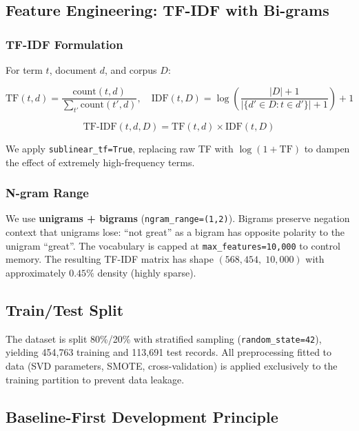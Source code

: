 \documentclass[11pt,a4paper]{article}
\begin{document}
\subsection{Feature Engineering: TF-IDF with Bi-grams}
\label{sec:features}

\subsubsection{TF-IDF Formulation}

For term $t$, document $d$, and corpus $D$:

\begin{equation}
  \text{TF}(t,d) = \frac{\mathrm{count}(t,d)}{\sum_{t'}\mathrm{count}(t',d)},
  \quad
  \text{IDF}(t,D) = \log\!\left(\frac{|D|+1}{|\{d' \in D : t \in d'\}|+1}\right)+1
\end{equation}

\begin{equation}
  \text{TF-IDF}(t,d,D) = \text{TF}(t,d) \times \text{IDF}(t,D)
\end{equation}

We apply \texttt{sublinear\_tf=True}, replacing raw TF with $\log(1 + \mathrm{TF})$
to dampen the effect of extremely high-frequency terms.

\subsubsection{N-gram Range}

We use \textbf{unigrams + bigrams} (\texttt{ngram\_range=(1,2)}).
Bigrams preserve negation context that unigrams lose:
``not great'' as a bigram has opposite polarity to the unigram ``great''.
The vocabulary is capped at \texttt{max\_features=10,000} to control memory.
The resulting TF-IDF matrix has shape $(568{,}454,\;10{,}000)$
with approximately $0.45\%$ density (highly sparse).

\subsection{Train/Test Split}

The dataset is split 80\%/20\% with stratified sampling (\texttt{random\_state=42}),
yielding 454,763 training and 113,691 test records.
All preprocessing fitted to data (SVD parameters, SMOTE, cross-validation)
is applied exclusively to the training partition to prevent data leakage.

\subsection{Baseline-First Development Principle}
\end{document}
